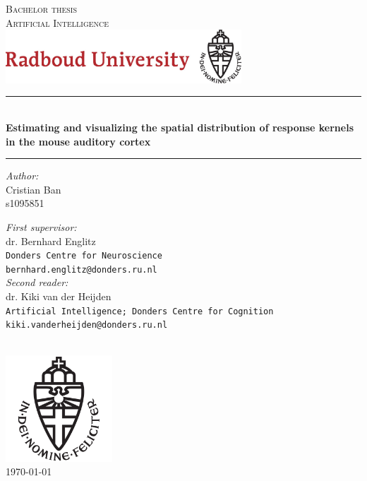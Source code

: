 \documentclass[11pt,a4paper, hidelinks]{report}
\begin{document}
\begin{titlepage}
\begin{center}
\textsc{\LARGE Bachelor thesis}\\ [0.5cm]
\textsc{ \LARGE Artificial Intelligence}\\[0.5cm]
\includegraphics[height=2cm]{RU_Text_&_Logo.jpg}

\vspace{0.4cm}
\hrule \text{}\\[0.4cm]
\textbf{\huge Estimating and visualizing the spatial distribution of response kernels in the mouse auditory cortex}\\[0.4cm]
\hrule
\vspace{2cm}
\begin{minipage}[t]{0.45\textwidth}
	\begin{flushleft} \large
		\textit{Author:}\\
		Cristian Ban\\
		s1095851
	\end{flushleft}
\end{minipage}
\begin{minipage}[t]{0.45\textwidth}
	\begin{flushright} \large
		\textit{First supervisor:}\\
		dr. Bernhard Englitz\\
		\texttt{Donders Centre for Neuroscience}\\
		\texttt{bernhard.englitz@donders.ru.nl}\\[1.0cm]
		\textit{Second reader:}\\
		dr. Kiki van der Heijden\\
		\texttt{Artificial Intelligence; Donders Centre for Cognition}\\
		\texttt{kiki.vanderheijden@donders.ru.nl}\\[1.3cm]
	\end{flushright}
\end{minipage}\\[1cm]
\includegraphics[width=4cm]{Imgs/RU_Logo.png}\\[0.5cm]
{\large \today}
\end{center}
\end{titlepage}
\end{document}
